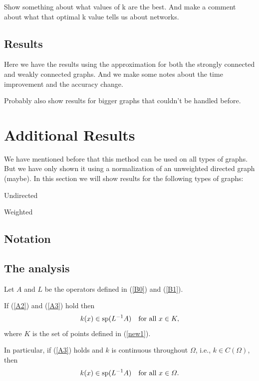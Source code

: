 \documentclass{imanum}
\begin{document}
Show something about what values of k are the best. And make a comment about what that optimal k value tells us about networks. 

\subsection{Results}
Here we have the results using the approximation for both the strongly connected and weakly connected graphs. And we make some notes about the time improvement and the accuracy change.

Probably also show results for bigger graphs that couldn't be handled before. 

\section{Additional Results}
We have mentioned before that this method can be used on all types of graphs. But we have only shown it using a normalization of an unweighted directed graph (maybe). In this section we will show results for the following types of graphs:

Undirected

Weighted

\clearpage


\subsection{Notation}
\label{sec3.1}



\subsection{The analysis}
\label{sec3.2}



\begin{theorem}
\label{theorem1}
Let $A$ and $L$ be the operators defined in (\ref{B0})
and (\ref{B1}).
\begin{NumberedListAlpha}
\item
If (\ref{A2}) and (\ref{A3}) hold then
\begin{equation*}
k(x) \in \mathrm{sp}(L^{-1}A) \quad \hbox{for all}\ x \in K,
\end{equation*}
where $K$ is the set of points defined in (\ref{new1}).
\item
In particular, if (\ref{A3}) holds and $k$ is continuous
throughout $\Omega$, i.e.,  $k \in C(\Omega)$, then
\begin{equation*}
k(x) \in \mathrm{sp}(L^{-1}A) \quad \hbox{for all}\ x \in \Omega.
\end{equation*}
\end{NumberedListAlpha}
\end{theorem}
\end{document}

